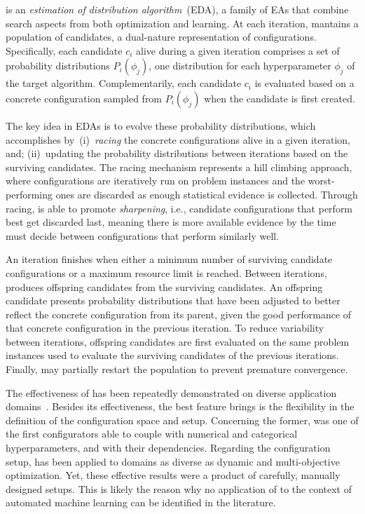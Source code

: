 \irace is an \emph{estimation of distribution algorithm}~(EDA), a family of EAs that  
combine search aspects from both optimization and learning. At each iteration, \irace mantains a population of candidates, a dual-nature representation of configurations. Specifically, each candidate $c_i$ alive during a given iteration comprises a set of probability distributions $P_i(\phi_j)$, one distribution for each hyperparameter $\phi_j$ of the target algorithm. Complementarily, each candidate $c_i$ is evaluated based on a concrete configuration sampled from $P_i(\phi_j)$ when the candidate is first created. 

The key idea in EDAs is to evolve these probability distributions, which \irace accomplishes by~(i)~\emph{racing} the concrete configurations alive in a given iteration, and; (ii)~updating the probability distributions between iterations based on the surviving candidates. The racing mechanism represents a hill climbing approach, where configurations are iteratively run on problem instances and the worst-performing ones are discarded as enough statistical evidence is collected. Through racing, \irace is able to promote \emph{sharpening}, i.e., candidate configurations that perform best get discarded last, meaning there is more available evidence by the time \irace must decide between configurations that perform similarly well.%

An iteration finishes when either a minimum number of surviving candidate configurations or a maximum resource limit is reached. Between iterations, \irace produces offspring candidates from the surviving candidates. An offspring candidate presents probability distributions that have been adjusted to better reflect the concrete configuration from its parent, given the good performance of that concrete configuration in the previous iteration. To reduce variability between iterations, offspring candidates are first evaluated on the same problem instances used to evaluate the surviving candidates of the previous iterations. Finally, \irace may partially restart the population to prevent premature convergence. %

The effectiveness of \irace has been repeatedly demonstrated on diverse application domains~\cite{BezerraPhD}. Besides its effectiveness, the best feature \irace brings is the flexibility in the definition of the configuration space and setup. Concerning the former, \irace was one of the first configurators able to couple with numerical and categorical hyperparameters, and with their dependencies. Regarding the configuration setup, \irace has been applied to domains as diverse as dynamic and multi-objective optimization. Yet, these effective results were a product of carefully, manually designed setups. This is likely the reason why no application of \irace to the context of automated machine learning can be identified in the literature.%

